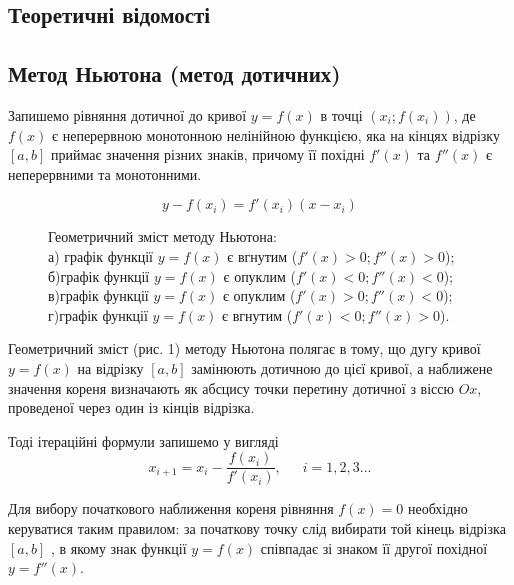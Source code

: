 \documentclass{article}
\begin{document}
\begin{large}
	\section*{Теоретичні відомості}
	\subsection*{Метод Ньютона (метод дотичних)}
	Запишемо рівняння дотичної до кривої $y = f(x)$ в точці $(x_i;f(x_i))$, де $f(x)$ є
	неперервною монотонною нелінійною функцією, яка на кінцях відрізку $[a,b]$ приймає значення різних знаків, причому її похідні $f'(x)$ та $f''(x)$ є неперервними та монотонними.
	
	\begin{equation}
		y - f(x_i) = f'(x_i)(x-x_i)\nonumber
	\end{equation}
	
	\begin{figure}[h]
		\centering
		\subfigure[]{\texttt{[image: 1]}} 
		\subfigure[]{\texttt{[image: 2]}} 
		\subfigure[]{\texttt{[image: 3]}}
		\subfigure[]{\texttt{[image: 4]}}
		\captionsetup{justification=centering}
		\caption{Геометричний зміст методу Ньютона:\\
		а) графік функції $y = f(x)$ є вгнутим ($f'(x)>0;f''(x)>0$);\\
		б)графік функції $y = f(x)$ є опуклим ($f'(x)<0;f''(x)<0$);\\
		в)графік функції $y = f(x)$ є опуклим ($f'(x)>0;f''(x)<0$);\\
		г)графік функції $y = f(x)$ є вгнутим ($f'(x)<0;f''(x)>0$).}
	\end{figure}
	
	Геометричний зміст (рис. 1) методу Ньютона полягає в тому, що дугу кривої $y = f(x)$ на відрізку $[a,b]$ замінюють дотичною до цієї кривої, а наближене значення кореня визначають як абсцису точки перетину дотичної з віссю $Ox$, проведеної через один із кінців відрізка.

	Тоді ітераційні формули запишемо у вигляді
	\begin{equation}
		x_{i+1}=x_i-\frac{f(x_i)}{f'(x_i)}, \hspace{18pt}i=1,2,3...\nonumber
	\end{equation}
	
	Для вибору початкового наближення кореня рівняння $f(x) = 0$ необхідно керуватися таким правилом: за початкову точку слід вибирати той кінець відрізка $[a,b]$ , в якому знак функції $y= f(x)$ співпадає зі знаком її другої похідної $y=f''(x)$.
	

\end{large}
\end{document}
